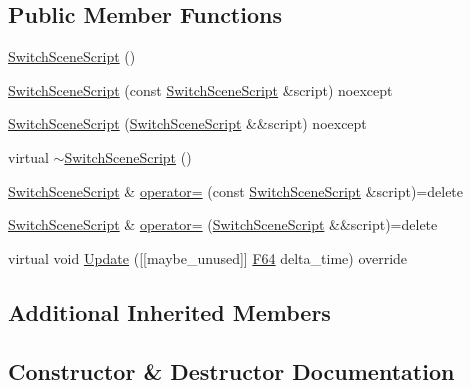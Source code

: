 \subsection*{Public Member Functions}
\begin{DoxyCompactItemize}
\item 
\hyperlink{classmage_1_1script_1_1_switch_scene_script_a7905bc08a81fbf2680e1b9e88a94988d}{Switch\+Scene\+Script} ()
\item 
\hyperlink{classmage_1_1script_1_1_switch_scene_script_af895d885db98e4b3ab7d3faca8fc8d8f}{Switch\+Scene\+Script} (const \hyperlink{classmage_1_1script_1_1_switch_scene_script}{Switch\+Scene\+Script} \&script) noexcept
\item 
\hyperlink{classmage_1_1script_1_1_switch_scene_script_af48c004b9419d4e462b6820297ebebd8}{Switch\+Scene\+Script} (\hyperlink{classmage_1_1script_1_1_switch_scene_script}{Switch\+Scene\+Script} \&\&script) noexcept
\item 
virtual \hyperlink{classmage_1_1script_1_1_switch_scene_script_ae4a846ba55d7b0ddb3730997ae162ba3}{$\sim$\+Switch\+Scene\+Script} ()
\item 
\hyperlink{classmage_1_1script_1_1_switch_scene_script}{Switch\+Scene\+Script} \& \hyperlink{classmage_1_1script_1_1_switch_scene_script_aeb69f01428c31fefd8e0d9b75aa7d3a9}{operator=} (const \hyperlink{classmage_1_1script_1_1_switch_scene_script}{Switch\+Scene\+Script} \&script)=delete
\item 
\hyperlink{classmage_1_1script_1_1_switch_scene_script}{Switch\+Scene\+Script} \& \hyperlink{classmage_1_1script_1_1_switch_scene_script_a69cbcb7b1216a3bc3422ff7db9340c27}{operator=} (\hyperlink{classmage_1_1script_1_1_switch_scene_script}{Switch\+Scene\+Script} \&\&script)=delete
\item 
virtual void \hyperlink{classmage_1_1script_1_1_switch_scene_script_a4915aa35bad8aab3ba024f0babfe4933}{Update} (\mbox{[}\mbox{[}maybe\+\_\+unused\mbox{]}\mbox{]} \hyperlink{namespacemage_ad26233bbec640deda836e572c1a23708}{F64} delta\+\_\+time) override
\end{DoxyCompactItemize}
\subsection*{Additional Inherited Members}


\subsection{Constructor \& Destructor Documentation}
\hypertarget{classmage_1_1script_1_1_switch_scene_script_a7905bc08a81fbf2680e1b9e88a94988d}{}\label{classmage_1_1script_1_1_switch_scene_script_a7905bc08a81fbf2680e1b9e88a94988d} 
